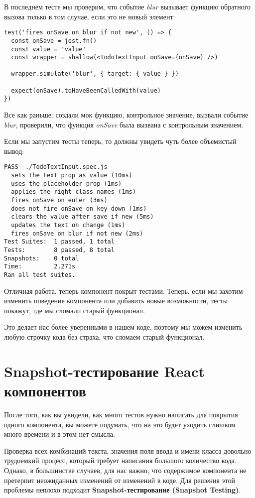 В последнем тесте мы проверим, что событие \textit{blur} вызывает функцию обратного вызова только в том случае, если это не новый элемент:

\begin{lstlisting}
test('fires onSave on blur if not new', () => {
  const onSave = jest.fn()
  const value = 'value'
  const wrapper = shallow(<TodoTextInput onSave={onSave} />)
  
  wrapper.simulate('blur', { target: { value } })
  
  expect(onSave).toHaveBeenCalledWith(value)
})
\end{lstlisting}

Все как раньше: создали мок функцию, контрольное значение, вызвали событие \textit{blur}, проверили, что функция \textit{onSave} была вызвана с контрольным значением.

Если мы запустим тесты теперь, то должны увидеть чуть более объемистый вывод:

\begin{lstlisting}
PASS  ./TodoTextInput.spec.js
  sets the text prop as value (10ms)
  uses the placeholder prop (1ms)
  applies the right class names (1ms)
  fires onSave on enter (3ms)
  does not fire onSave on key down (1ms)
  clears the value after save if new (5ms)
  updates the text on change (1ms)
  fires onSave on blur if not new (2ms)
Test Suites:  1 passed, 1 total
Tests:        8 passed, 8 total
Snapshots:    0 total
Time:         2.271s
Ran all test suites.
\end{lstlisting}

Отличная работа, теперь компонент покрыт тестами. Теперь, если мы захотим изменить поведение компонента или добавить новые возможности, тесты покажут, где мы сломали старый функционал.

Это делает нас более уверенными в нашем коде, поэтому мы можем изменить любую строчку кода без страха, что сломаем старый функционал. 

\section{Snapshot-тестирование React компонентов}

После того, как вы увидели, как много тестов нужно написать для покрытия одного компонента, вы можете подумать, что на это будет уходить слишком много времени и в этом нет смысла.

Проверка всех комбинаций текста, значения поля ввода и имени класса довольно трудоемкий процесс, который требует написания большого количество кода. Однако, в большинстве случаев, для нас важно, что содержимое компонента не претерпит неожиданных изменений от изменений в коде. Для решения этой проблемы неплохо подходит \textbf{Snapshot-тестирование (Snapshot Testing)}.

